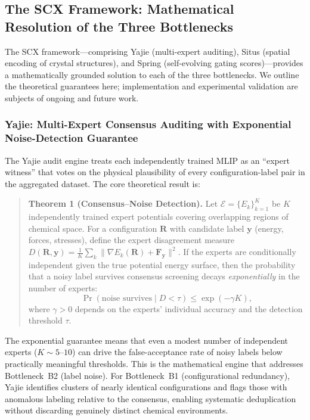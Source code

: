 \documentclass[twoside,prb,aps,floatfix,superscriptaddress,longbibliography]{revtex4-2}
\begin{document}
\subsection{The SCX Framework: Mathematical Resolution of the Three Bottlenecks}

The SCX framework---comprising Yajie (multi-expert auditing), Situs (spatial encoding of crystal structures), and Spring (self-evolving gating scores)---provides a mathematically grounded solution to each of the three bottlenecks. We outline the theoretical guarantees here; implementation and experimental validation are subjects of ongoing and future work.

\subsubsection{Yajie: Multi-Expert Consensus Auditing with Exponential Noise-Detection Guarantee}

The Yajie audit engine treats each independently trained MLIP as an ``expert witness'' that votes on the physical plausibility of every configuration-label pair in the aggregated dataset. The core theoretical result is:

\begin{quote}
\textbf{Theorem 1 (Consensus–Noise Detection).} Let $\mathcal{E} = \{E_k\}_{k=1}^K$ be $K$ independently trained expert potentials covering overlapping regions of chemical space. For a configuration $\mathbf{R}$ with candidate label $\mathbf{y}$ (energy, forces, stresses), define the expert disagreement measure $D(\mathbf{R}, \mathbf{y}) = \frac{1}{K}\sum_k \| \nabla E_k(\mathbf{R}) + \mathbf{F}_{\mathbf{y}} \|^2$. If the experts are conditionally independent given the true potential energy surface, then the probability that a noisy label survives consensus screening decays \emph{exponentially} in the number of experts:
\begin{equation}
\Pr(\text{noise survives} \mid D < \tau) \le \exp(-\gamma K),
\label{eq:yajie_exp_guarantee}
\end{equation}
where $\gamma > 0$ depends on the experts' individual accuracy and the detection threshold $\tau$.
\end{quote}

The exponential guarantee means that even a modest number of independent experts ($K \sim 5$--$10$) can drive the false-acceptance rate of noisy labels below practically meaningful thresholds. This is the mathematical engine that addresses Bottleneck~B2 (label noise). For Bottleneck~B1 (configurational redundancy), Yajie identifies clusters of nearly identical configurations and flags those with anomalous labeling relative to the consensus, enabling systematic deduplication without discarding genuinely distinct chemical environments.
\end{document}
